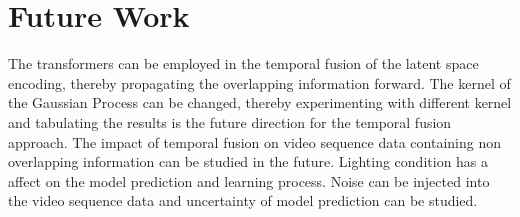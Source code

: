     \section{Future Work}
    
	The transformers can be employed in the temporal fusion of the latent space encoding, thereby propagating the overlapping information forward. The kernel of the Gaussian Process can be changed, thereby experimenting with different kernel and tabulating the results is the future direction for the temporal fusion approach. The impact of temporal fusion on video sequence data containing non overlapping information can be studied in the future. Lighting condition has a affect on the model prediction and learning process. Noise can be injected into the video sequence data and uncertainty of model prediction can be studied.
    

